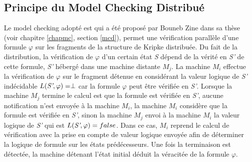 
\subsection{Principe du Model Checking Distribu\'{e}}
 
Le model checking adopté est qui a été  propos\'{e} par Bouneb Zine dans sa thèse \citep{depriester2011bouneb} (voir chapitre \ref{chapmc}, section \ref{mcd}), permet une vérification parallèle d’une formule $\varphi$  sur les fragments de la structure de Kripke distribuée. Du fait de la distribution, la vérification de $\varphi$ d'un certain état \emph{S} dépend de la vérité en \emph{S’} de cette formule, \emph{S’}  hébergé dans une  machine distante $M_j$. La machine $M_i$ effectue la vérification de $\varphi$ sur le fragment détenue en considérant la valeur logique de \emph{S’} indécidable  $L (\emph{S’},\varphi )=\perp$ car la formule $\varphi$ peut être vérifiée en \emph{S’}. Lorsque la machine $M_j$ termine le calcul est que la formule est vérifiée en \emph{S’}, aucune notification n'est envoyée à la machine $M_i$, la machine $M_i$ considère que la formule est vérifiée en \emph{S’}, sinon la machine $M_j$ envoi à la machine $M_i$ la valeur logique de \emph{S’} qui est $L(\emph{S’}, \varphi) =false$. Dans ce cas, $M_i$ reprend le calcul de vérification avec la prise en compte de valeur logique envoyée afin de déterminer la logique de formule sur les états prédécesseurs. Une fois la terminaison est détectée, la machine détenant l’état initial déduit la véracitée de la formule $\varphi$.

